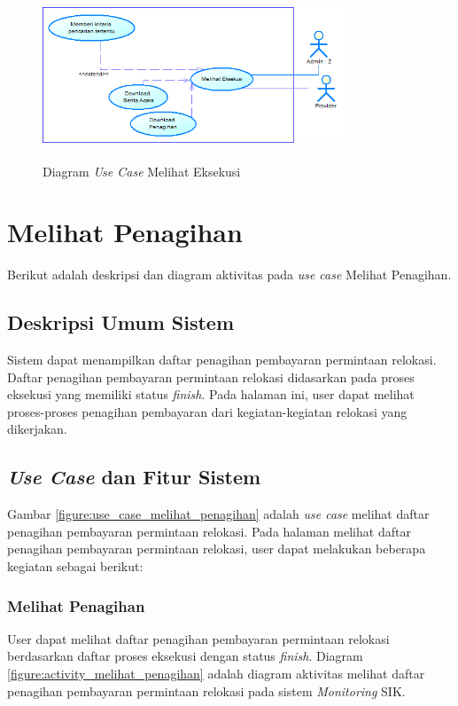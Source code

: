 	\begin{figure}[h!]
	\centerline
	{\includegraphics[width=9cm,height=5cm]{bab4/use-case-melihat-eksekusi.png}}
	\caption{Diagram \textit{Use Case} Melihat Eksekusi}
	\label{figure:use_case_melihat_eksekusi}
	\end{figure}
	
\section{Melihat Penagihan}
Berikut adalah deskripsi dan diagram aktivitas pada \textit{use case} Melihat Penagihan.
\subsection{Deskripsi Umum Sistem}
\tab Sistem dapat menampilkan daftar penagihan pembayaran permintaan relokasi. Daftar penagihan pembayaran permintaan relokasi didasarkan pada proses eksekusi yang memiliki status \textit{finish}. Pada halaman ini, user dapat melihat proses-proses penagihan pembayaran dari kegiatan-kegiatan relokasi yang dikerjakan.
\subsection{\textit{Use Case} dan Fitur Sistem}
Gambar \ref{figure:use_case_melihat_penagihan} adalah \textit{use case} melihat daftar penagihan pembayaran permintaan relokasi. Pada halaman melihat daftar penagihan pembayaran permintaan relokasi, user dapat melakukan beberapa kegiatan sebagai berikut:
	\subsubsection{Melihat Penagihan}
	User dapat melihat daftar penagihan pembayaran permintaan relokasi berdasarkan daftar proses eksekusi dengan status \textit{finish}. Diagram \ref{figure:activity_melihat_penagihan} adalah diagram aktivitas melihat daftar penagihan pembayaran permintaan relokasi pada sistem \textit{Monitoring} SIK.
	
